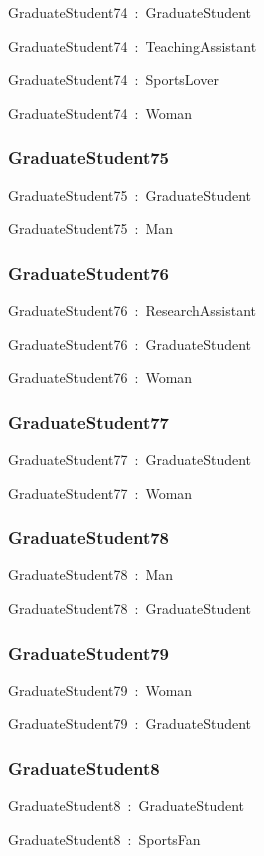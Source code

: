 \documentclass{article}
\begin{document}
GraduateStudent74~:~GraduateStudent

GraduateStudent74~:~TeachingAssistant

GraduateStudent74~:~SportsLover

GraduateStudent74~:~Woman

\subsubsection*{GraduateStudent75}

GraduateStudent75~:~GraduateStudent

GraduateStudent75~:~Man

\subsubsection*{GraduateStudent76}

GraduateStudent76~:~ResearchAssistant

GraduateStudent76~:~GraduateStudent

GraduateStudent76~:~Woman

\subsubsection*{GraduateStudent77}

GraduateStudent77~:~GraduateStudent

GraduateStudent77~:~Woman

\subsubsection*{GraduateStudent78}

GraduateStudent78~:~Man

GraduateStudent78~:~GraduateStudent

\subsubsection*{GraduateStudent79}

GraduateStudent79~:~Woman

GraduateStudent79~:~GraduateStudent

\subsubsection*{GraduateStudent8}

GraduateStudent8~:~GraduateStudent

GraduateStudent8~:~SportsFan
\end{document}
